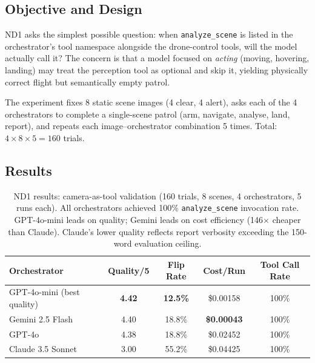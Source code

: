 \subsection{Objective and Design}
\label{sec:ch4_nd1_design}

ND1 asks the simplest possible question: when \texttt{analyze\_scene} is listed in the
orchestrator's tool namespace alongside the drone-control tools, will the model actually call
it?  The concern is that a model focused on \emph{acting} (moving, hovering, landing) may
treat the perception tool as optional and skip it, yielding physically correct flight but
semantically empty patrol.

The experiment fixes 8 static scene images (4 clear, 4 alert), asks each of the 4
orchestrators to complete a single-scene patrol (arm, navigate, analyse, land, report), and
repeats each image--orchestrator combination 5 times.  Total: $4 \times 8 \times 5 = 160$
trials.

\subsection{Results}
\label{sec:ch4_nd1_results}

\begin{table}[ht]
  \caption{ND1 results: camera-as-tool validation (160 trials, 8 scenes, 4 orchestrators,
    5 runs each).  All orchestrators achieved 100\% \texttt{analyze\_scene} invocation rate.
    GPT-4o-mini leads on quality; Gemini leads on cost efficiency (146$\times$ cheaper than
    Claude).  Claude's lower quality reflects report verbosity exceeding the 150-word
    evaluation ceiling.}
  \label{tab:ch4_nd1}
  \centering
  \small
  \begin{tabular}{lcccc}
    \toprule
    Orchestrator & Quality/5 & Flip Rate & Cost/Run & Tool Call Rate \\
    \midrule
    GPT-4o-mini (best quality) & \textbf{4.42} & \textbf{12.5\%} & \$0.00158 & 100\% \\
    Gemini 2.5 Flash            & 4.40          & 18.8\%          & \textbf{\$0.00043} & 100\% \\
    GPT-4o                      & 4.38          & 18.8\%          & \$0.02452 & 100\% \\
    Claude 3.5 Sonnet           & 3.00          & 55.2\%          & \$0.04425 & 100\% \\
    \bottomrule
  \end{tabular}
\end{table}


